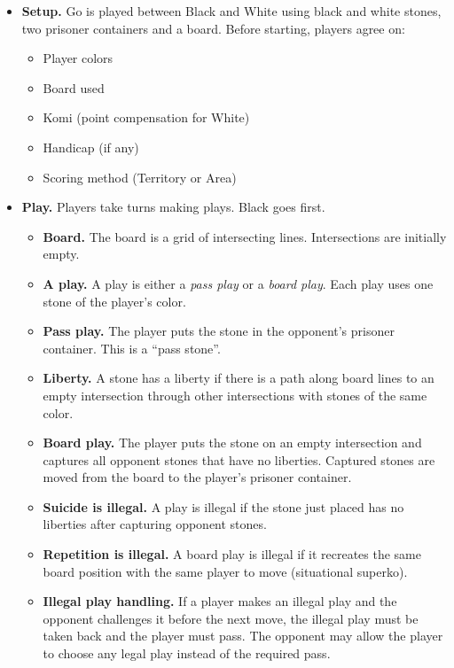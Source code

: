 \documentclass[11pt]{article}
\begin{document}
\small
\begin{itemize}
\item \textbf{Setup.} Go is played between Black and White using black and white stones, two prisoner containers and a board.
Before starting, players agree on:
    \begin{itemize}
    \item Player colors
    \item Board used
    \item Komi (point compensation for White)
    \item Handicap (if any)
    \item Scoring method (Territory or Area)
    \end{itemize}

\item \textbf{Play.} Players take turns making plays.
Black goes first.
    \begin{itemize}
    \item \textbf{Board.} The board is a grid of intersecting lines.
    Intersections are initially empty.
    \item \textbf{A play.} A play is either a \textit{pass play} or a \textit{board play}.
    Each play uses one stone of the player's color.
    \item \textbf{Pass play.} The player puts the stone in the opponent's prisoner container.
    This is a ``pass stone''.
    \item \textbf{Liberty.} A stone has a liberty if there is a path along board lines to an empty intersection through other intersections with stones of the same color.
    \item \textbf{Board play.} The player puts the stone on an empty intersection and captures all opponent stones that have no liberties.
    Captured stones are moved from the board to the player's prisoner container.
    \item \textbf{Suicide is illegal.} A play is illegal if the stone just placed has no liberties after capturing opponent stones.
    \item \textbf{Repetition is illegal.} A board play is illegal if it recreates the same board position with the same player to move (situational superko).
    \item \textbf{Illegal play handling.} If a player makes an illegal play and the opponent challenges it before the next move, the illegal play must be taken back and the player must pass.
    The opponent may allow the player to choose any legal play instead of the required pass.
    \end{itemize}


\end{itemize}
\end{document}
